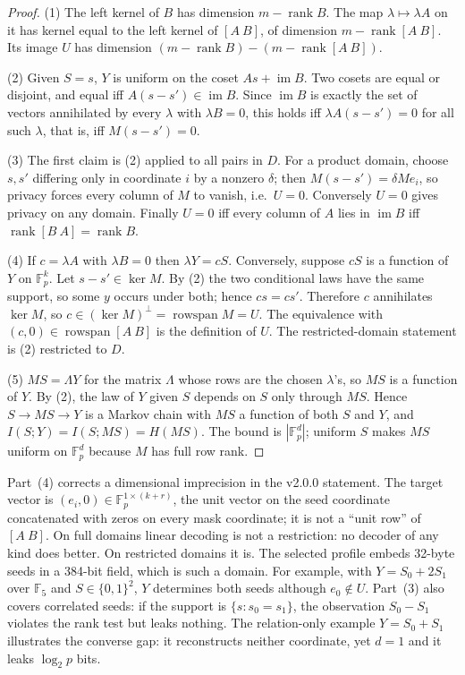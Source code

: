 \documentclass[pdflatex,sn-mathphys-num]{sn-jnl}
\theoremstyle{plain}
\theoremstyle{definition}
\newcommand{\F}{\mathbb{F}}
\newcommand{\rk}{\operatorname{rank}}
\newcommand{\im}{\operatorname{im}}
\begin{document}
\begin{proof}
(1) The left kernel of $B$ has dimension $m-\rk B$. The map $\lambda\mapsto\lambda A$ on it has kernel equal to the left kernel of $[A\ B]$, of dimension $m-\rk[A\ B]$. Its image $U$ has dimension $(m-\rk B)-(m-\rk[A\ B])$.

(2) Given $S=s$, $Y$ is uniform on the coset $As+\im B$. Two cosets are equal or disjoint, and equal iff $A(s-s')\in\im B$. Since $\im B$ is exactly the set of vectors annihilated by every $\lambda$ with $\lambda B=0$, this holds iff $\lambda A(s-s')=0$ for all such $\lambda$, that is, iff $M(s-s')=0$.

(3) The first claim is (2) applied to all pairs in $D$. For a product domain, choose $s,s'$ differing only in coordinate $i$ by a nonzero $\delta$; then $M(s-s')=\delta M e_i$, so privacy forces every column of $M$ to vanish, i.e.\ $U=0$. Conversely $U=0$ gives privacy on any domain. Finally $U=0$ iff every column of $A$ lies in $\im B$ iff $\rk[B\ A]=\rk B$.

(4) If $c=\lambda A$ with $\lambda B=0$ then $\lambda Y=cS$. Conversely, suppose $cS$ is a function of $Y$ on $\F_p^k$. Let $s-s'\in\ker M$. By (2) the two conditional laws have the same support, so some $y$ occurs under both; hence $cs=cs'$. Therefore $c$ annihilates $\ker M$, so $c\in(\ker M)^\perp=\operatorname{rowspan}M=U$. The equivalence with $(c,0)\in\operatorname{rowspan}[A\ B]$ is the definition of $U$. The restricted-domain statement is (2) restricted to $D$.

(5) $MS=\Lambda Y$ for the matrix $\Lambda$ whose rows are the chosen $\lambda$'s, so $MS$ is a function of $Y$. By (2), the law of $Y$ given $S$ depends on $S$ only through $MS$. Hence $S\to MS\to Y$ is a Markov chain with $MS$ a function of both $S$ and $Y$, and $I(S;Y)=I(S;MS)=H(MS)$. The bound is $|\F_p^d|$; uniform $S$ makes $MS$ uniform on $\F_p^d$ because $M$ has full row rank.
\end{proof}

Part~(4) corrects a dimensional imprecision in the v2.0.0 statement. The target vector is $(e_i,0)\in\F_p^{1\times(k+r)}$, the unit vector on the seed coordinate concatenated with zeros on every mask coordinate; it is not a ``unit row'' of $[A\ B]$. On full domains linear decoding is not a restriction: no decoder of any kind does better. On restricted domains it is. The selected profile embeds 32-byte seeds in a 384-bit field, which is such a domain. For example, with $Y=S_0+2S_1$ over $\F_5$ and $S\in\{0,1\}^2$, $Y$ determines both seeds although $e_0\notin U$. Part~(3) also covers correlated seeds: if the support is $\{s:s_0=s_1\}$, the observation $S_0-S_1$ violates the rank test but leaks nothing. The relation-only example $Y=S_0+S_1$ illustrates the converse gap: it reconstructs neither coordinate, yet $d=1$ and it leaks $\log_2p$ bits.
\end{document}

